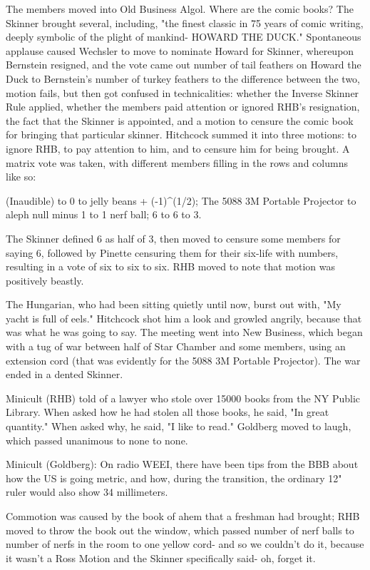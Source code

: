 \documentclass[12pt]{article}
\begin{document}
The members moved into Old Business Algol. Where are the comic books? The Skinner brought several, including, "the finest classic in 75 years of comic writing, deeply symbolic of the plight of mankind- HOWARD THE DUCK." Spontaneous applause caused Wechsler to move to nominate Howard for Skinner, whereupon Bernstein resigned, and the vote came out number of tail feathers on Howard the Duck to Bernstein's number of turkey feathers to the difference between the two, motion fails, but then got confused in technicalities: whether the Inverse Skinner Rule applied, whether the members paid attention or ignored RHB's resignation, the fact that the Skinner is appointed, and a motion to censure the comic book for bringing that particular skinner. Hitchcock summed it into three motions: to ignore RHB, to pay attention to him, and to censure him for being brought. A matrix vote was taken, with different members filling in the rows and columns like so:

(Inaudible) to 0 to jelly beans + (-1)^(1/2); The 5088 3M Portable Projector to aleph null minus 1 to 1 nerf ball; 6 to 6 to 3.

The Skinner defined 6 as half of 3, then moved to censure some members for saying 6, followed by Pinette censuring them for their six-life with numbers, resulting in a vote of six to six to six. RHB moved to note that motion was positively beastly.

The Hungarian, who had been sitting quietly until now, burst out with, "My yacht is full of eels." Hitchcock shot him a look and growled angrily, because that was what he was going to say. The meeting went into New Business, which began with a tug of war between half of Star Chamber and some members, using an extension cord (that was evidently for the 5088 3M Portable Projector). The war ended in a dented Skinner.

Minicult (RHB) told of a lawyer who stole over 15000 books from the NY Public Library. When asked how he had stolen all those books, he said, "In great quantity." When asked why, he said, "I like to read." Goldberg moved to laugh, which passed unanimous to none to none.

Minicult (Goldberg): On radio WEEI, there have been tips from the BBB about how the US is going metric, and how, during the transition, the ordinary 12" ruler would also show 34 millimeters.

Commotion was caused by the book of ahem that a freshman had brought; RHB moved to throw the book out the window, which passed number of nerf balls to number of nerfs in the room to one yellow cord- and so we couldn't do it, because it wasn't a Ross Motion and the Skinner specifically said- oh, forget it.
\end{document}
